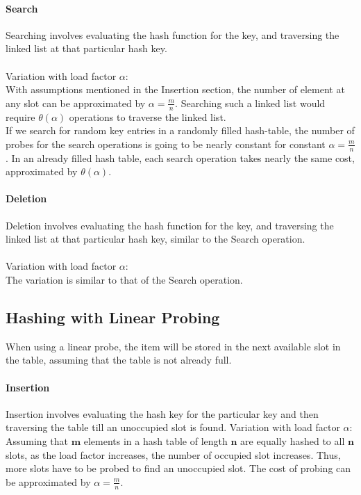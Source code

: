 \documentclass[12pt]{article}
\begin{document}
\paragraph{Search}
Searching involves evaluating the hash function for the key, and traversing the linked list at that particular hash key.\\ \\
Variation with load factor $\alpha$:\\
With assumptions mentioned in the Insertion section, the number of element at any slot can be approximated by $\alpha=\frac{m}{n}$. Searching such a linked list would require $\theta(\alpha)$ operations to traverse the linked list.\\
If we search for random key entries in a randomly filled hash-table, the number of probes for the search operations is going to be nearly constant for constant $\alpha=\frac{m}{n}$. In an already filled hash table, each search operation takes nearly the same cost, approximated by $\theta(\alpha)$.

\paragraph{Deletion}
Deletion involves evaluating the hash function for the key, and traversing the linked list at that particular hash key, similar to the Search operation.\\ \\
Variation with load factor $\alpha$:\\
The variation is similar to that of the Search operation.

\subsection{Hashing with Linear Probing}\label{Hashing with Linear Probing}
When using a linear probe, the item will be stored in the next available slot in the table, assuming that the table is not already full.
\paragraph{Insertion}
Insertion involves evaluating the hash key for the particular key and then traversing the table till an unoccupied slot is found.
Variation with load factor $\alpha$:\\
Assuming that $\mathbf{m}$ elements in a hash table of length $\mathbf{n}$ are equally hashed to all $\mathbf{n}$ slots, as the load factor increases, the number of occupied slot increases. Thus, more slots have to be probed to find an unoccupied slot. The cost of probing can be approximated by $\alpha=\frac{m}{n}$. 
\end{document}
